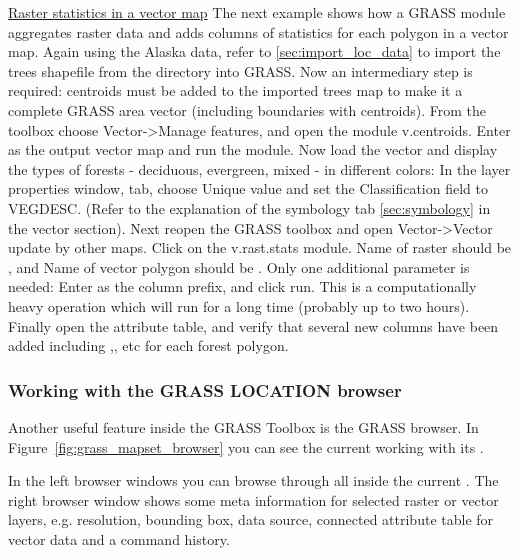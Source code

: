 \underline{Raster statistics in a vector map}\linebreak 
The next example shows how a GRASS module aggregates raster data and adds columns of statistics for each polygon in a vector map. Again using the Alaska data, refer to \ref{sec:import_loc_data} to import the trees shapefile from the  directory into GRASS.  Now an intermediary step is required: centroids must be added to the imported trees map to make it a complete GRASS area vector (including boundaries with centroids).  From the toolbox choose Vector->Manage features, and open the module v.centroids. Enter as the output vector map  and run the module.  Now load the  vector and display the types of forests - deciduous, evergreen, mixed - in different colors: In the layer properties window,  tab, choose Unique value and set the Classification field to VEGDESC. (Refer to the explanation of the symbology tab \ref{sec:symbology} in the vector section).
Next reopen the GRASS toolbox and open Vector->Vector update by other maps. Click on the v.rast.stats module. Name of raster should be , and Name of vector polygon should be . Only one additional parameter is needed: Enter  as the column prefix, and click run. This is a computationally heavy operation which will run for a long time (probably up to two hours). Finally open the  attribute table, and verify that several new columns have been added including ,, etc for each forest polygon.




\subsubsection{Working with the GRASS LOCATION browser} 

Another useful feature inside the GRASS Toolbox is the GRASS 
 browser. In Figure~\ref{fig:grass_mapset_browser} you 
can see the current working  with its .

In the left browser windows you can browse through all  
inside the current . The right browser window shows some 
meta information for selected raster or vector layers, e.g. resolution, 
bounding box, data source, connected attribute table for vector data and a 
command history.

